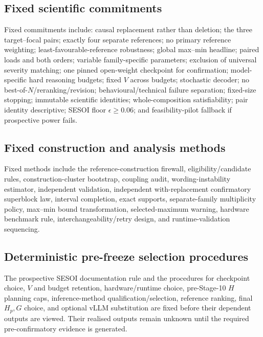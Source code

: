 \documentclass[11pt,a4paper]{article}
\begin{document}
\subsection{Fixed scientific commitments}
Fixed commitments include: causal replacement rather than deletion; the three target--focal pairs; exactly four separate references; no primary reference weighting; least-favourable-reference robustness; global max--min headline; paired loads and both orders; variable family-specific parameters; exclusion of universal severity matching; one pinned open-weight checkpoint for confirmation; model-specific hard reasoning budgets; fixed $V$ across budgets; stochastic decoder; no best-of-$N$/reranking/revision; behavioural/technical failure separation; fixed-size stopping; immutable scientific identities; whole-composition satisfiability; pair identity descriptive; SESOI floor $\epsilon\ge0.06$; and feasibility-pilot fallback if prospective power fails.

\subsection{Fixed construction and analysis methods}
Fixed methods include the reference-construction firewall, eligibility/candidate rules, construction-cluster bootstrap, coupling audit, wording-instability estimator, independent validation, independent with-replacement confirmatory superblock law, interval completion, exact supports, separate-family multiplicity policy, max--min bound transformation, selected-maximum warning, hardware benchmark rule, interchangeability/retry design, and runtime-validation sequencing.

\subsection{Deterministic pre-freeze selection procedures}
The prospective SESOI documentation rule and the procedures for checkpoint choice, $V$ and budget retention, hardware/runtime choice, pre-Stage-10 $H$ planning caps, inference-method qualification/selection, reference ranking, final $H_p,G$ choice, and optional vLLM substitution are fixed before their dependent outputs are viewed. Their realised outputs remain unknown until the required pre-confirmatory evidence is generated.
\end{document}
